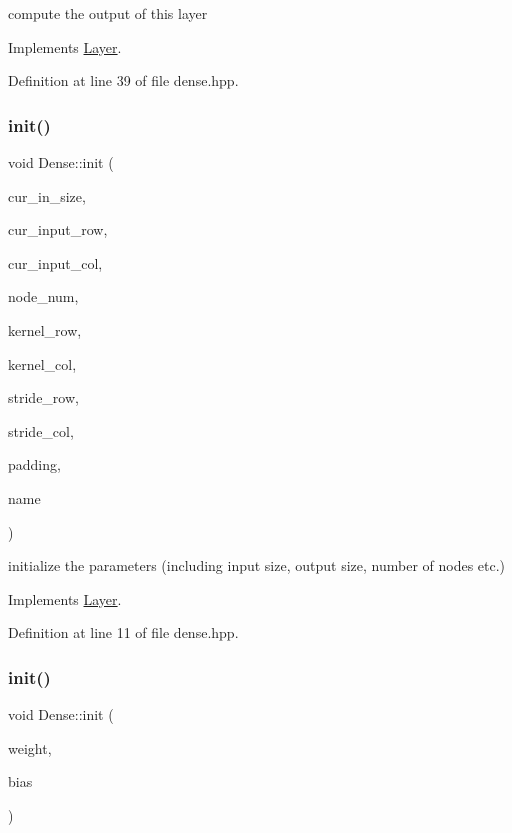 compute the output of this layer 



Implements \hyperlink{class_layer_ac0b116d692ea457f8e7c0f79f7159004}{Layer}.



Definition at line 39 of file dense.\+hpp.

\mbox{\label{class_dense_a681837f518909d237e26aa195274218c}} 
\subsubsection{\texorpdfstring{init()}{init()}\hspace{0.1cm}{\footnotesize\ttfamily [1/2]}}
{\footnotesize\ttfamily void Dense\+::init (\begin{DoxyParamCaption}\item[{int}]{cur\+\_\+in\+\_\+size,  }\item[{int}]{cur\+\_\+input\+\_\+row,  }\item[{int}]{cur\+\_\+input\+\_\+col,  }\item[{double}]{node\+\_\+num,  }\item[{double}]{kernel\+\_\+row,  }\item[{double}]{kernel\+\_\+col,  }\item[{double}]{stride\+\_\+row,  }\item[{double}]{stride\+\_\+col,  }\item[{std\+::string}]{padding,  }\item[{std\+::string}]{name }\end{DoxyParamCaption})\hspace{0.3cm}{\ttfamily [virtual]}}



initialize the parameters (including input size, output size, number of nodes etc.) 



Implements \hyperlink{class_layer_aab662b9c8e61cd7375cbb4413d2e3037}{Layer}.



Definition at line 11 of file dense.\+hpp.

\mbox{\label{class_dense_a4f35191bbb7ad43770fed2621439e992}} 
\subsubsection{\texorpdfstring{init()}{init()}\hspace{0.1cm}{\footnotesize\ttfamily [2/2]}}
{\footnotesize\ttfamily void Dense\+::init (\begin{DoxyParamCaption}\item[{Eigen\+::\+Matrix\+Xd}]{weight,  }\item[{Eigen\+::\+Matrix\+Xd}]{bias }\end{DoxyParamCaption})}



